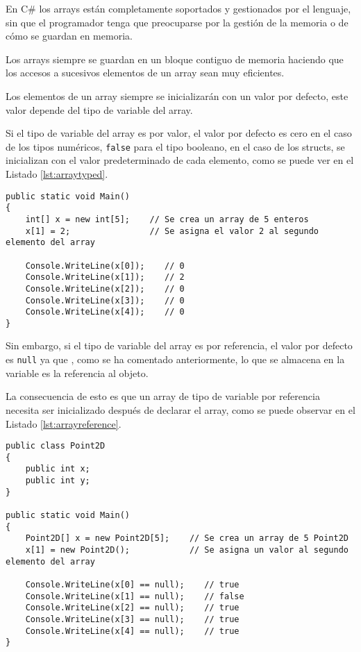 \documentclass{pre-tfg}
\begin{document}
En C\# los arrays están completamente soportados y gestionados por el lenguaje, sin que el programador tenga que preocuparse por la gestión de la memoria o de cómo se guardan en memoria.

Los arrays siempre se guardan en un bloque contiguo de memoria haciendo que los accesos a sucesivos elementos de un array sean muy eficientes.

Los elementos de un array siempre se inicializarán con un valor por defecto, este valor depende del tipo de variable del array.

Si el tipo de variable del array es por valor, el valor por defecto es cero en el caso de los tipos numéricos, \texttt{false} para el tipo booleano, en el caso de los structs, se inicializan con el valor predeterminado de cada elemento, como se puede ver en el Listado \ref{lst:arraytyped}.

\begin{spacing}{1}
\begin{lstlisting}[float=htbp, caption=Ejemplo de array con tipo de variable por valor, label=lst:arraytyped]
public static void Main()
{
	int[] x = new int[5];    // Se crea un array de 5 enteros
	x[1] = 2;                // Se asigna el valor 2 al segundo elemento del array
		
	Console.WriteLine(x[0]);    // 0
	Console.WriteLine(x[1]);    // 2
	Console.WriteLine(x[2]);    // 0
	Console.WriteLine(x[3]);    // 0
	Console.WriteLine(x[4]);    // 0
}
\end{lstlisting}
\end{spacing}

Sin embargo, si el tipo de variable del array es por referencia, el valor por defecto es \texttt{null} ya que , como se ha comentado anteriormente, lo que se almacena en la variable es la referencia al objeto.

La consecuencia de esto es que un array de tipo de variable por referencia necesita ser inicializado después de declarar el array, como se puede observar en el Listado \ref{lst:arrayreference}.

\begin{spacing}{1}
\begin{lstlisting}[float=htbp, caption=Ejemplo de array con tipo de variable por referencia, label=lst:arrayreference]
public class Point2D 
{ 
	public int x;
	public int y;
}

public static void Main()
{
	Point2D[] x = new Point2D[5];    // Se crea un array de 5 Point2D
	x[1] = new Point2D();            // Se asigna un valor al segundo elemento del array
		
	Console.WriteLine(x[0] == null);    // true
	Console.WriteLine(x[1] == null);    // false
	Console.WriteLine(x[2] == null);    // true
	Console.WriteLine(x[3] == null);    // true
	Console.WriteLine(x[4] == null);    // true
}
\end{lstlisting}
\end{spacing}
\end{document}
